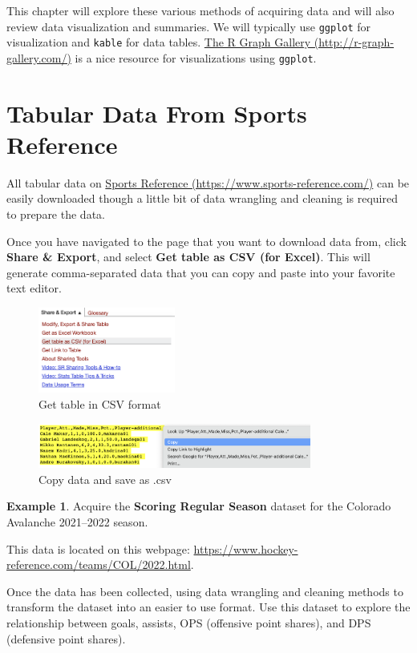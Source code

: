 \documentclass[
  11pt,
]{book}
\theoremstyle{definition}
\theoremstyle{definition}
\newtheorem{example}{Example}[chapter]
\theoremstyle{definition}
\theoremstyle{definition}
\theoremstyle{remark}
\begin{document}
This chapter will explore these various methods of acquiring data and will also review data visualization and summaries. We will typically use \texttt{ggplot} for visualization and \texttt{kable} for data tables. \href{http://r-graph-gallery.com/}{The R Graph Gallery (http://r-graph-gallery.com/)} is a nice resource for visualizations using \texttt{ggplot}.

\hypertarget{tabular-data-from-sports-reference}{%
\section{Tabular Data From Sports Reference}\label{tabular-data-from-sports-reference}}

All tabular data on \href{https://www.sports-reference.com/}{Sports Reference (https://www.sports-reference.com/)} can be easily downloaded though a little bit of data wrangling and cleaning is required to prepare the data.

Once you have navigated to the page that you want to download data from, click \textbf{Share \& Export}, and select \textbf{Get table as CSV (for Excel)}. This will generate comma-separated data that you can copy and paste into your favorite text editor.

\begin{figure}
\centering
\includegraphics[width=0.4\textwidth,height=\textheight]{images/sports-ref-csv.png}
\caption{Get table in CSV format}
\end{figure}

\begin{figure}
\centering
\includegraphics[width=0.8\textwidth,height=\textheight]{images/sports-ref-csv2.png}
\caption{Copy data and save as .csv}
\end{figure}

\newpage

\begin{example}
Acquire the \textbf{Scoring Regular Season} dataset for the Colorado Avalanche 2021--2022 season.

This data is located on this webpage:
\url{https://www.hockey-reference.com/teams/COL/2022.html}.

Once the data has been collected, using data wrangling and cleaning methods to transform the dataset into an easier to use format. Use this dataset to explore the relationship between goals, assists, OPS (offensive point shares), and DPS (defensive point shares).
\end{example}
\end{document}
